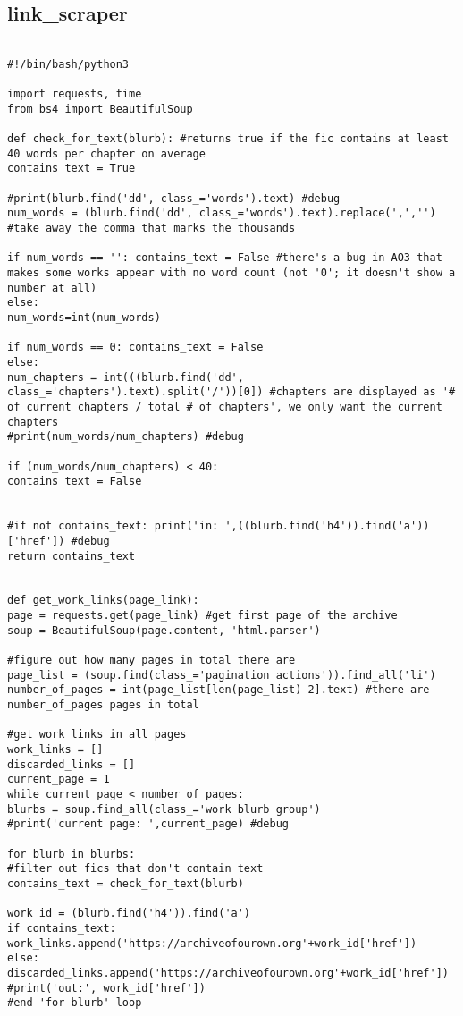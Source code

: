 \documentclass{pre-tfg}
\begin{document}
\subsection{link\_scraper}
\begin{lstlisting}[style=consola]

#!/bin/bash/python3

import requests, time
from bs4 import BeautifulSoup

def check_for_text(blurb): #returns true if the fic contains at least 40 words per chapter on average
contains_text = True

#print(blurb.find('dd', class_='words').text) #debug
num_words = (blurb.find('dd', class_='words').text).replace(',','') #take away the comma that marks the thousands

if num_words == '': contains_text = False #there's a bug in AO3 that makes some works appear with no word count (not '0'; it doesn't show a number at all)
else:
num_words=int(num_words) 

if num_words == 0: contains_text = False
else:
num_chapters = int(((blurb.find('dd', class_='chapters').text).split('/'))[0]) #chapters are displayed as '# of current chapters / total # of chapters', we only want the current chapters
#print(num_words/num_chapters) #debug

if (num_words/num_chapters) < 40: 
contains_text = False


#if not contains_text: print('in: ',((blurb.find('h4')).find('a'))['href']) #debug
return contains_text


def get_work_links(page_link):
page = requests.get(page_link) #get first page of the archive
soup = BeautifulSoup(page.content, 'html.parser')

#figure out how many pages in total there are
page_list = (soup.find(class_='pagination actions')).find_all('li')
number_of_pages = int(page_list[len(page_list)-2].text) #there are number_of_pages pages in total

#get work links in all pages
work_links = []
discarded_links = []
current_page = 1
while current_page < number_of_pages:
blurbs = soup.find_all(class_='work blurb group')
#print('current page: ',current_page) #debug

for blurb in blurbs:
#filter out fics that don't contain text
contains_text = check_for_text(blurb)

work_id = (blurb.find('h4')).find('a')
if contains_text: work_links.append('https://archiveofourown.org'+work_id['href'])
else: 
discarded_links.append('https://archiveofourown.org'+work_id['href'])
#print('out:', work_id['href'])	
#end 'for blurb' loop


\end{lstlisting}
\end{document}
